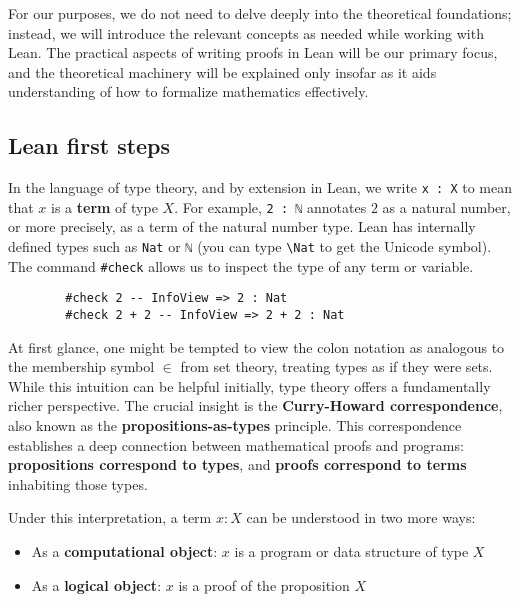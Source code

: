 For our purposes, we do not need to delve deeply into the theoretical foundations; 
instead, we will introduce the relevant concepts as needed while working with Lean. 
The practical aspects of writing proofs in Lean will be our primary focus, 
and the theoretical machinery will be explained only insofar as it aids understanding 
of how to formalize mathematics effectively.
\subsection{Lean first steps}

In the language of type theory, and by extension in Lean, we write \lstinline[language=lean]|x : X| 
to mean that $x$ is a \textbf{term} of type $X$. 
For example, \lstinline[language=lean]|2 : ℕ| annotates $2$ as a natural number, 
or more precisely, as a term of the natural number type. 
Lean has internally defined types such as \lstinline[language=lean]|Nat| or \lstinline[language=lean]|ℕ| 
(you can type \texttt{\textbackslash Nat} to get the Unicode symbol). 
The command \lstinline[language=lean]|#check| allows us to inspect the type of any term or variable.
\begin{example}
    \begin{lstlisting}
        #check 2 -- InfoView => 2 : Nat
        #check 2 + 2 -- InfoView => 2 + 2 : Nat

    \end{lstlisting}
\end{example}
At first glance, one might be tempted to view the colon notation as analogous to the membership 
symbol $\in$ from set theory, treating types as if they were sets. 
While this intuition can be helpful initially, type theory offers a fundamentally richer perspective. 
The crucial insight is the \textbf{Curry-Howard correspondence}, 
also known as the \textbf{propositions-as-types} principle. 
This correspondence establishes a deep connection between mathematical proofs and programs: 
\textbf{propositions correspond to types}, and \textbf{proofs correspond to terms} inhabiting those types. 

Under this interpretation, a term $x : X$ can be understood in two more ways:
\begin{itemize}
    \item As a \textbf{computational object}: $x$ is a program or data structure of type $X$
    \item As a \textbf{logical object}: $x$ is a proof of the proposition $X$
\end{itemize}

